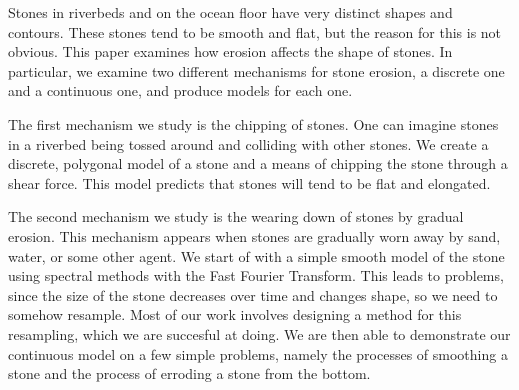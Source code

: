 Stones in riverbeds and on the ocean floor have very distinct shapes and contours. These stones tend to be smooth and flat, but the reason for this is not obvious. This paper examines how erosion affects the shape of stones. In particular, we examine two different mechanisms for stone erosion, a discrete one and a continuous one, and produce models for each one.

The first mechanism we study is the chipping of stones. One can imagine stones in a riverbed being tossed around and colliding with other stones. We create a discrete, polygonal model of a stone and a means of chipping the stone through a shear force. This model predicts that stones will tend to be flat and elongated.

The second mechanism we study is the wearing down of stones by gradual erosion. This mechanism appears when stones are gradually worn away by sand, water, or some other agent. We start of with a simple smooth model of the stone using spectral methods with the Fast Fourier Transform. This leads to problems, since the size of the stone decreases over time and changes shape, so we need to somehow resample. Most of our work involves designing a method for this resampling, which we are succesful at doing. We are then able to demonstrate our continuous model on a few simple problems, namely the processes of smoothing a stone and the process of erroding a stone from the bottom.
